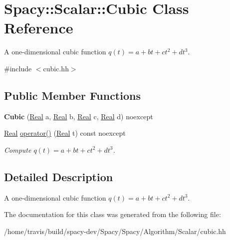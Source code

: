 \hypertarget{classSpacy_1_1Scalar_1_1Cubic}{\section{Spacy\-:\-:Scalar\-:\-:Cubic Class Reference}
\label{classSpacy_1_1Scalar_1_1Cubic}
}


A one-\/dimensional cubic function $q(t) = a + bt + ct^2 + dt^3$.  




{\ttfamily \#include $<$cubic.\-hh$>$}

\subsection*{Public Member Functions}
\begin{DoxyCompactItemize}
\item 
\hypertarget{classSpacy_1_1Scalar_1_1Cubic_a696ca24d2548b4b363265d635098af6f}{{\bfseries Cubic} (\hyperlink{classSpacy_1_1Real}{Real} a, \hyperlink{classSpacy_1_1Real}{Real} b, \hyperlink{classSpacy_1_1Real}{Real} c, \hyperlink{classSpacy_1_1Real}{Real} d) noexcept}\label{classSpacy_1_1Scalar_1_1Cubic_a696ca24d2548b4b363265d635098af6f}

\item 
\hypertarget{classSpacy_1_1Scalar_1_1Cubic_aafc854991e7d70f2057f56da861b8204}{\hyperlink{classSpacy_1_1Real}{Real} \hyperlink{classSpacy_1_1Scalar_1_1Cubic_aafc854991e7d70f2057f56da861b8204}{operator()} (\hyperlink{classSpacy_1_1Real}{Real} t) const noexcept}\label{classSpacy_1_1Scalar_1_1Cubic_aafc854991e7d70f2057f56da861b8204}

\begin{DoxyCompactList}\small\item\em Compute $q(t) = a + bt + ct^2 + dt^3 $. \end{DoxyCompactList}\end{DoxyCompactItemize}


\subsection{Detailed Description}
A one-\/dimensional cubic function $q(t) = a + bt + ct^2 + dt^3$. 

The documentation for this class was generated from the following file\-:\begin{DoxyCompactItemize}
\item 
/home/travis/build/spacy-\/dev/\-Spacy/\-Spacy/\-Algorithm/\-Scalar/cubic.\-hh\end{DoxyCompactItemize}
